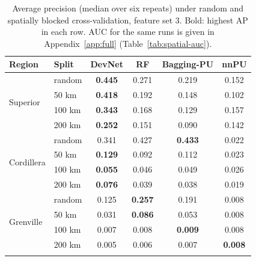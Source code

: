 \documentclass[pdflatex,sn-apa]{sn-jnl}
\begin{document}
\begin{table}[t]
\caption{Average precision (median over six repeats) under random and spatially blocked cross-validation, feature set 3. Bold: highest AP in each row. AUC for the same runs is given in Appendix~\ref{app:full} (Table~\ref{tab:spatial-auc}).}\label{tab:spatial}
\footnotesize
\setlength{\tabcolsep}{3pt}
\begin{tabular*}{\textwidth}{@{\extracolsep\fill}llcccc}
\toprule
Region & Split & DevNet & RF & Bagging-PU & nnPU \\
\midrule
\multirow{4}{*}{Superior} & random & \textbf{0.445} & 0.271 & 0.219 & 0.152 \\
 & 50 km & \textbf{0.418} & 0.192 & 0.148 & 0.102 \\
 & 100 km & \textbf{0.343} & 0.168 & 0.129 & 0.157 \\
 & 200 km & \textbf{0.252} & 0.151 & 0.090 & 0.142 \\
\midrule
\multirow{4}{*}{Cordillera} & random & 0.341 & 0.427 & \textbf{0.433} & 0.022 \\
 & 50 km & \textbf{0.129} & 0.092 & 0.112 & 0.023 \\
 & 100 km & \textbf{0.055} & 0.046 & 0.049 & 0.026 \\
 & 200 km & \textbf{0.076} & 0.039 & 0.038 & 0.019 \\
\midrule
\multirow{4}{*}{Grenville} & random & 0.125 & \textbf{0.257} & 0.191 & 0.008 \\
 & 50 km & 0.031 & \textbf{0.086} & 0.053 & 0.008 \\
 & 100 km & 0.007 & 0.008 & \textbf{0.009} & 0.008 \\
 & 200 km & 0.005 & 0.006 & 0.007 & \textbf{0.008} \\
\botrule
\end{tabular*}
\end{table}
\end{document}
